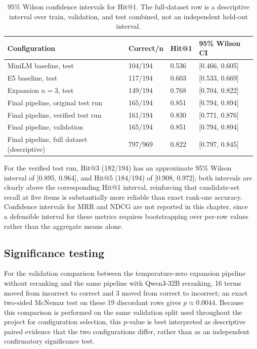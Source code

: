 \begingroup
\footnotesize
\begin{table}[htbp]
\centering
\begin{tabular}{p{5.0cm}p{1.6cm}p{1.1cm}p{2.0cm}}
\toprule
\textbf{Configuration} & \textbf{Correct/n} & \textbf{Hit@1} & \textbf{95\% Wilson CI}\\
\midrule
MiniLM baseline, test & 104/194 & 0.536 & [0.466, 0.605]\\
E5 baseline, test & 117/194 & 0.603 & [0.533, 0.669]\\
Expansion $n=3$, test & 149/194 & 0.768 & [0.704, 0.822]\\
Final pipeline, original test run & 165/194 & 0.851 & [0.794, 0.894]\\
Final pipeline, verified test run & 161/194 & 0.830 & [0.771, 0.876]\\
Final pipeline, validation & 165/194 & 0.851 & [0.794, 0.894]\\
Final pipeline, full dataset (descriptive) & 797/969 & 0.822 & [0.797, 0.845]\\
\bottomrule
\end{tabular}
\caption{95\% Wilson confidence intervals for Hit@1. The full-dataset row is a descriptive interval over train, validation, and test combined, not an independent held-out interval.}
\label{tab:wilson}
\end{table}
\endgroup

For the verified test run, Hit@3 (182/194) has an approximate 95\% Wilson interval of [0.895, 0.964], and Hit@5 (184/194) of [0.908, 0.972]; both intervals are clearly above the corresponding Hit@1 interval, reinforcing that candidate-set recall at five items is substantially more reliable than exact rank-one accuracy. Confidence intervals for MRR and NDCG are not reported in this chapter, since a defensible interval for these metrics requires bootstrapping over per-row values rather than the aggregate means alone.

\subsection{Significance testing}

For the validation comparison between the temperature-zero expansion pipeline without reranking and the same pipeline with Qwen3-32B reranking, 16 terms moved from incorrect to correct and 3 moved from correct to incorrect; an exact two-sided McNemar test on these 19 discordant rows gives $p \approx 0.0044$. Because this comparison is performed on the same validation split used throughout the project for configuration selection, this $p$-value is best interpreted as descriptive paired evidence that the two configurations differ, rather than as an independent confirmatory significance test.

